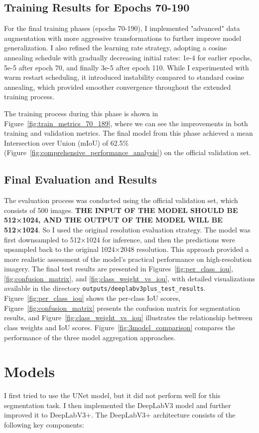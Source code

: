 \documentclass[]{article}
\begin{document}
\subsection{Training Results for Epochs 70-190}
For the final training phases (epochs 70-190), I implemented "advanced" data augmentation with more aggressive transformations to further improve model generalization. I also refined the learning rate strategy, adopting a cosine annealing schedule with gradually decreasing initial rates: 1e-4 for earlier epochs, 5e-5 after epoch 70, and finally 3e-5 after epoch 110. While I experimented with warm restart scheduling, it introduced instability compared to standard cosine annealing, which provided smoother convergence throughout the extended training process.

The training process during this phase is shown in Figure~\ref{fig:train_metrics_70_189}, where we can see the improvements in both training and validation metrics. The final model from this phase achieved a mean Intersection over Union (mIoU) of 62.5\% (Figure~\ref{fig:comprehensive_performance_analysis}) on the official validation set.

\subsection{Final Evaluation and Results}\label{sec:Final_Evaluation}
The evaluation process was conducted using the official validation set, which consists of 500 images. \textbf{THE INPUT OF THE MODEL SHOULD BE 512×1024, AND THE OUTPUT OF THE MODEL WILL BE 512×1024}. So I used the original resolution evaluation strategy. The model was first downsampled to 512×1024 for inference, and then the predictions were upsampled back to the original 1024×2048 resolution. This approach provided a more realistic assessment of the model's practical performance on high-resolution imagery.
The final test results are presented in Figures~\ref{fig:per_class_iou}, \ref{fig:confusion_matrix}, and \ref{fig:class_weight_vs_iou}, with detailed visualizations available in the directory \texttt{outputs/deeplabv3plus\_test\_results}. Figure~\ref{fig:per_class_iou} shows the per-class IoU scores, Figure~\ref{fig:confusion_matrix} presents the confusion matrix for segmentation results, and Figure~\ref{fig:class_weight_vs_iou} illustrates the relationship between class weights and IoU scores. Figure~\ref{fig:3model_comparison} compares the performance of the three model aggregation approaches.


\section{Models}\label{sec:Models}
I first tried to use the UNet model, but it did not perform well for this segmentation task. I then implemented the DeepLabV3 model and further improved it to DeepLabV3+. The DeepLabV3+ architecture consists of the following key components:
\end{document}
